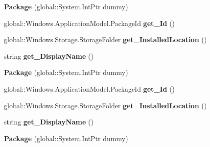 \begin{DoxyCompactItemize}
{\bfseries Package} (global\+::\+System.\+Int\+Ptr dummy)
\item 
\mbox{\label{class_windows_1_1_application_model_1_1_package_a44c6383bcefe77fa64076b9138ae2b37}} 
global\+::\+Windows.\+Application\+Model.\+Package\+Id {\bfseries get\+\_\+\+Id} ()
\item 
\mbox{\label{class_windows_1_1_application_model_1_1_package_a806299fe1d916b5758d73cd2a9fd49ec}} 
global\+::\+Windows.\+Storage.\+Storage\+Folder {\bfseries get\+\_\+\+Installed\+Location} ()
\item 
\mbox{\label{class_windows_1_1_application_model_1_1_package_a317d75aec1790849c01bb4a23057e36a}} 
string {\bfseries get\+\_\+\+Display\+Name} ()
\item 
\mbox{\label{class_windows_1_1_application_model_1_1_package_a72c00ea4b9b5889235b31657e01833f5}} 
{\bfseries Package} (global\+::\+System.\+Int\+Ptr dummy)
\item 
\mbox{\label{class_windows_1_1_application_model_1_1_package_a44c6383bcefe77fa64076b9138ae2b37}} 
global\+::\+Windows.\+Application\+Model.\+Package\+Id {\bfseries get\+\_\+\+Id} ()
\item 
\mbox{\label{class_windows_1_1_application_model_1_1_package_a806299fe1d916b5758d73cd2a9fd49ec}} 
global\+::\+Windows.\+Storage.\+Storage\+Folder {\bfseries get\+\_\+\+Installed\+Location} ()
\item 
\mbox{\label{class_windows_1_1_application_model_1_1_package_a317d75aec1790849c01bb4a23057e36a}} 
string {\bfseries get\+\_\+\+Display\+Name} ()
\item 
\mbox{\label{class_windows_1_1_application_model_1_1_package_a72c00ea4b9b5889235b31657e01833f5}} 
{\bfseries Package} (global\+::\+System.\+Int\+Ptr dummy)
\item 
\mbox{\label{class_windows_1_1_application_model_1_1_package_a44c6383bcefe77fa64076b9138ae2b37}} 

\end{DoxyCompactItemize}
